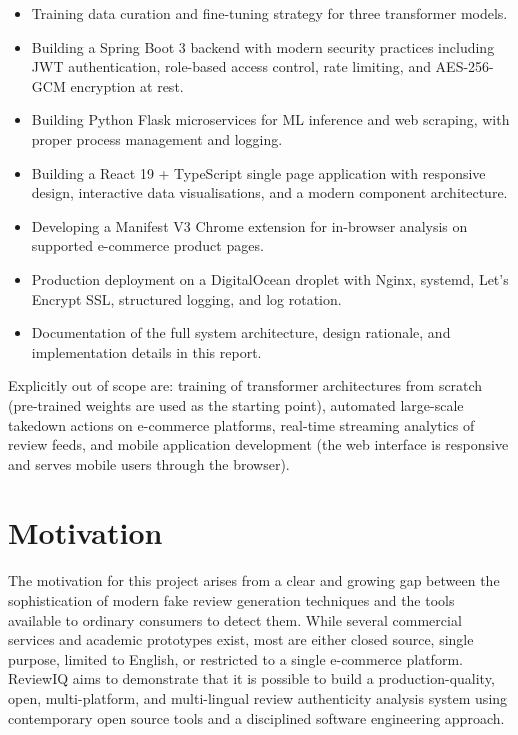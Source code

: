 \documentclass[12pt,a4paper,oneside]{report}
\begin{document}
\begin{itemize}[leftmargin=*]
  \item Training data curation and fine-tuning strategy for three
        transformer models.
  \item Building a Spring Boot 3 backend with modern security practices
        including JWT authentication, role-based access control, rate
        limiting, and AES-256-GCM encryption at rest.
  \item Building Python Flask microservices for ML inference and
        web scraping, with proper process management and logging.
  \item Building a React 19 + TypeScript single page application with
        responsive design, interactive data visualisations, and a modern
        component architecture.
  \item Developing a Manifest V3 Chrome extension for in-browser
        analysis on supported e-commerce product pages.
  \item Production deployment on a DigitalOcean droplet with Nginx,
        systemd, Let's Encrypt SSL, structured logging, and log rotation.
  \item Documentation of the full system architecture, design rationale,
        and implementation details in this report.
\end{itemize}

Explicitly out of scope are: training of transformer architectures
from scratch (pre-trained weights are used as the starting point),
automated large-scale takedown actions on e-commerce platforms,
real-time streaming analytics of review feeds, and mobile application
development (the web interface is responsive and serves mobile users
through the browser).

\section{Motivation}
The motivation for this project arises from a clear and growing gap
between the sophistication of modern fake review generation techniques
and the tools available to ordinary consumers to detect them. While
several commercial services and academic prototypes exist, most are
either closed source, single purpose, limited to English, or restricted
to a single e-commerce platform. ReviewIQ aims to demonstrate that it is
possible to build a production-quality, open, multi-platform, and
multi-lingual review authenticity analysis system using contemporary
open source tools and a disciplined software engineering approach.
\end{document}
